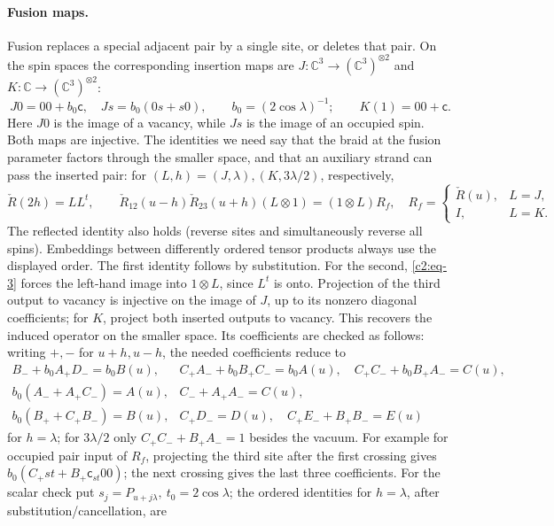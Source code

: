 \paragraph{Fusion maps.}
Fusion replaces a special adjacent pair by a single site, or deletes
that pair. On the spin spaces the corresponding insertion maps are
\(J:\mathbb C^3\to(\mathbb C^3)^{\otimes2}\) and
\(K:\mathbb C\to(\mathbb C^3)^{\otimes2}\):
\[
 J0=00+b_0 \mathsf c,\quad Js=b_0(0s+s0),\qquad b_0=(2\cos\lambda)^{-1};\qquad
 K(1)=00+\mathsf c .
\]
Here \(J0\) is the image of a vacancy, while \(Js\) is the image of
an occupied spin. Both maps are injective. The identities we need say
that the braid at the fusion parameter factors through the smaller
space, and that an auxiliary strand can pass the inserted pair:
for \((L,h)=(J,\lambda),(K,3\lambda/2)\), respectively,
\begin{equation}
 \check R(2h)=LL^t,\qquad
 \check R_{12}(u-h)\check R_{23}(u+h)(L\otimes1)=(1\otimes L)R_f,
 \quad R_f=\begin{cases}\check R(u),&L=J,\\ I,&L=K.\end{cases}                 \label{c2:eq-20}
\end{equation}
The reflected identity also holds (reverse sites and simultaneously reverse all spins). Embeddings between differently ordered tensor products always use the displayed order. The first identity follows by substitution. For the second,
\eqref{c2:eq-3} forces the left-hand image into \(1\otimes L\), since
\(L^t\) is onto. Projection of the third output to vacancy is injective
on the image of \(J\), up to its nonzero diagonal coefficients; for
\(K\), project both inserted outputs to vacancy. This recovers the
induced operator on the smaller space. Its coefficients are checked as
follows: writing \(+,-\) for \(u+h,u-h\), the needed coefficients reduce to
\begin{equation}
\begin{array}{ll}
 B_-+b_0 A_+D_-=b_0 B(u),
 &C_+ A_-+b_0B_+C_-=b_0 A(u),\quad C_+ C_-+b_0B_+A_-=C(u),\\
 b_0(A_-+A_+ C_-)=A(u), & C_-+A_+A_-=C(u),\\
 b_0(B_++C_+B_-)=B(u),& C_+D_-=D(u),\quad C_+E_-+B_+B_-=E(u)
\end{array}                                                               \label{c2:eq-21}
\end{equation}
for \(h=\lambda\); for \(3\lambda/2\) only \(C_+C_-+B_+A_-=1\) besides the vacuum. For example for occupied pair input of \(R_f\), projecting the third site after the first crossing gives \(b_0(C_+ st+B_+\mathsf c_{st}00)\); the next crossing gives the last three coefficients. For the scalar check put \(s_j=P_{u+j\lambda},\ t_0=2\cos\lambda\); the ordered identities for \(h=\lambda\), after substitution/cancellation, are
